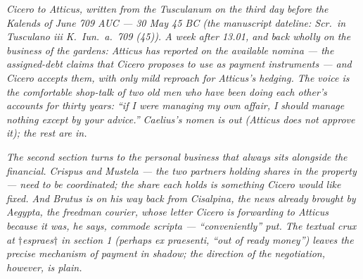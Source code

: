 
\textit{Cicero to Atticus, written from the
Tusculanum on the third day before the Kalends of
June 709 AUC --- 30 May 45 BC (the manuscript
dateline: \textit{Scr.\ in Tusculano iii K.\ Iun.\
a.\ 709 (45)}). A week after 13.01, and back wholly
on the business of the gardens: Atticus has reported
on the available \textit{nomina} --- the
assigned-debt claims that Cicero proposes to use as
payment instruments --- and Cicero accepts them, with
only mild reproach for Atticus's hedging. The voice
is the comfortable shop-talk of two old men who have
been doing each other's accounts for thirty years:
``if I were managing my own affair, I should manage
nothing except by your advice.'' Caelius's
\textit{nomen} is out (Atticus does not approve it);
the rest are in.}

\textit{The second section turns to the personal
business that always sits alongside the financial.
Crispus and Mustela --- the two partners holding
shares in the property --- need to be coordinated;
the share each holds is something Cicero would like
fixed. And Brutus is on his way back from Cisalpina,
the news already brought by Aegypta, the freedman
courier, whose letter Cicero is forwarding to Atticus
because it was, he says, \textit{commode scripta} ---
``conveniently'' put. The textual crux at
$\dagger$espraes$\dagger$ in section 1 (perhaps
\textit{ex praesenti}, ``out of ready money'') leaves
the precise mechanism of payment in shadow; the
direction of the negotiation, however, is plain.}
